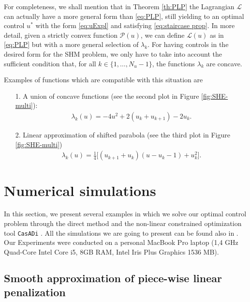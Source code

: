 \documentclass[twocolumn]{autart}    %
\begin{document}
\begin{remark}

For completeness, we shall mention that in Theorem \ref{th:PLP} the Lagrangian $\mathcal L$ can actually have a more general form than \eqref{eq:PLP}, still yielding to an optimal control $u^\ast$ with the form \eqref{eq:uExpl} and satisfying \eqref{eq:staircase prop}. In more detail, given a strictly convex function $\mathcal{P}(u)$, we can define $\mathcal{L}(u)$ as in \eqref{eq:PLP} but with a more general selection of  $\lambda_k$. For having controls in the desired form for the SHM problem, we only have to take into account the sufficient condition that, for all $k \in \{1,\dots,N_u-1\}$, the functions $\lambda_k$ are concave.

Examples of functions which are compatible with this situation are
\begin{enumerate}
    \item[1.] A union of concave functions (see the second plot in Figure \ref{fig:SHE-multi}):
    \begin{align*}
        \lambda_k(u) = -4u^2 + 2(u_k + u_{k+1}) - 2u_{k}.
    \end{align*}
    \item[2.] Linear approximation of shifted parabola (see the third plot in Figure \ref{fig:SHE-multi})
    \begin{align*}
        \lambda_k(u) = \frac 1 4\Big[(u_{k+1}+u_{k}) (u-u_k-1) + u_k^2\Big].
    \end{align*}
\end{enumerate}
\end{remark}
\section{Numerical simulations}\label{sec:Simulations}

In this section, we present several examples in which we solve our optimal control problem through the direct method and the non-linear constrained optimization tool \texttt{CasADi} \cite{Andersson2019}. All the simulations we are going to present can be found also in \cite{simus}. Our Experiments were conducted on a personal MacBook Pro laptop (1,4 GHz Quad-Core Intel Core i5, 8GB RAM, Intel Iris Plus
Graphics 1536 MB). 
%
\subsection{Smooth approximation of piece-wise linear penalization}
\end{document}

